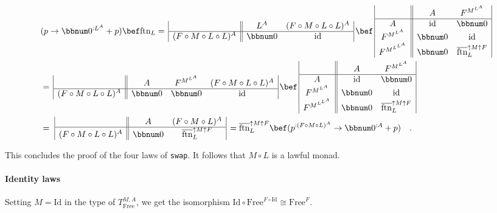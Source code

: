 \begin{align*}
 & (p\rightarrow\bbnum 0^{:L^{A}}+p)\bef\text{ftn}_{L}=\,\begin{array}{|c||cc|}
 & L^{A} & (F\circ M\circ L\circ L)^{A}\\
\hline (F\circ M\circ L\circ L)^{A} & \bbnum 0 & \text{id}
\end{array}\,\bef\,\begin{array}{|c||cc|}
 & A & F^{M^{L^{A}}}\\
\hline A & \text{id} & \bbnum 0\\
F^{M^{L^{A}}} & \bbnum 0 & \text{id}\\
F^{M^{L^{L^{A}}}} & \bbnum 0 & \overline{\text{ftn}}_{L}^{\uparrow M\uparrow F}
\end{array}\\
 & =\,\begin{array}{|c||ccc|}
 & A & F^{M^{L^{A}}} & (F\circ M\circ L\circ L)^{A}\\
\hline (F\circ M\circ L\circ L)^{A} & \bbnum 0 & \bbnum 0 & \text{id}
\end{array}\,\bef\,\begin{array}{|c||cc|}
 & A & F^{M^{L^{A}}}\\
\hline A & \text{id} & \bbnum 0\\
F^{M^{L^{A}}} & \bbnum 0 & \text{id}\\
F^{M^{L^{L^{A}}}} & \bbnum 0 & \overline{\text{ftn}}_{L}^{\uparrow M\uparrow F}
\end{array}\\
 & =\,\,\begin{array}{|c||cc|}
 & A & (F\circ M\circ L)^{A}\\
\hline (F\circ M\circ L\circ L)^{A} & \bbnum 0 & \overline{\text{ftn}}_{L}^{\uparrow M\uparrow F}
\end{array}\,=\overline{\text{ftn}}_{L}^{\uparrow M\uparrow F}\bef(p^{:(F\circ M\circ L)^{A}}\rightarrow\bbnum 0^{:A}+p)\quad.
\end{align*}

This concludes the proof of the four laws of \lstinline!swap!. It
follows that $M\circ L$ is a lawful monad.

\paragraph{Identity laws}

Setting $M=\text{Id}$ in the type of $T_{\text{Free}}^{M,A}$, we
get the isomorphism $\text{Id}\circ\text{Free}^{F\circ\text{Id}}\cong\text{Free}^{F}$.

